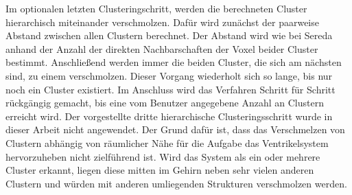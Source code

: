 Im optionalen letzten Clusteringschritt, werden die berechneten Cluster hierarchisch miteinander verschmolzen. Dafür wird zunächst der paarweise Abstand zwischen allen Clustern berechnet. Der Abstand wird wie bei Sereda \cite{sereda2006automating} anhand der Anzahl der direkten Nachbarschaften der Voxel beider Cluster bestimmt. Anschließend werden immer die beiden Cluster, die sich am nächsten sind, zu einem verschmolzen. Dieser Vorgang wiederholt sich so lange, bis nur noch ein Cluster existiert. Im Anschluss wird das Verfahren Schritt für Schritt rückgängig gemacht, bis eine vom Benutzer angegebene Anzahl an Clustern erreicht wird.
\newline
Der vorgestellte dritte hierarchische Clusteringsschritt wurde in dieser Arbeit nicht angewendet. Der Grund dafür ist, dass das Verschmelzen von Clustern abhängig von räumlicher Nähe für die Aufgabe das Ventrikelsystem hervorzuheben nicht zielführend ist. Wird das System als ein oder mehrere Cluster erkannt, liegen diese mitten im Gehirn neben sehr vielen anderen Clustern und würden mit anderen umliegenden Strukturen verschmolzen werden.




















































